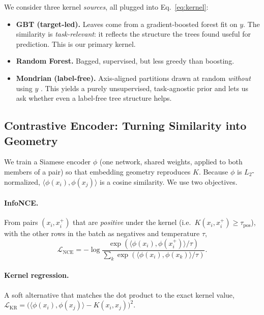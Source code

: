 \documentclass[11pt]{article}
\begin{document}

We consider three kernel \emph{sources}, all plugged into Eq.~\eqref{eq:kernel}:
\begin{itemize}
  \item \textbf{GBT (target-led).} Leaves come from a gradient-boosted forest fit
  on $y$. The similarity is \emph{task-relevant}: it reflects the structure the
  trees found useful for prediction. This is our primary kernel.
  \item \textbf{Random Forest.} Bagged, supervised, but less greedy than boosting.
  \item \textbf{Mondrian (label-free).} Axis-aligned partitions drawn at random
  \emph{without} using $y$ \cite{balog2016}. This yields a purely unsupervised,
  task-agnostic prior and lets us ask whether even a label-free tree structure
  helps.
\end{itemize}

\subsection{Contrastive Encoder: Turning Similarity into Geometry}

We train a Siamese encoder $\phi$ (one network, shared weights, applied to both
members of a pair) so that embedding geometry reproduces $K$. Because $\phi$ is
$L_2$-normalized, $\langle\phi(x_i),\phi(x_j)\rangle$ is a cosine similarity. We
use two objectives.

\paragraph{InfoNCE.} From pairs $(x_i,x_i^+)$ that are \emph{positive} under the
kernel (i.e.\ $K(x_i,x_i^+)\!\ge\!\tau_{\text{pos}}$), with the other rows in the
batch as negatives and temperature $\tau$,
\begin{equation}
\mathcal{L}_{\text{NCE}}=-\log\frac{\exp(\langle\phi(x_i),\phi(x_i^+)\rangle/\tau)}
{\sum_{k}\exp(\langle\phi(x_i),\phi(x_k)\rangle/\tau)}.
\label{eq:infonce}
\end{equation}

\paragraph{Kernel regression.} A soft alternative that matches the dot product to
the exact kernel value,
$\mathcal{L}_{\text{KR}}=\big(\langle\phi(x_i),\phi(x_j)\rangle-K(x_i,x_j)\big)^2.$
\end{document}
